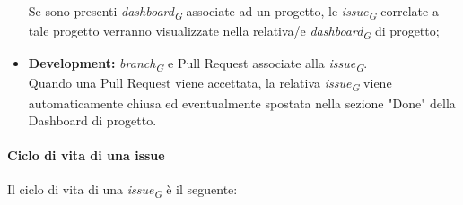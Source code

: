 \begin{itemize}
    Se sono presenti \textit{dashboard}\textsubscript{\textit{G}} associate ad un progetto, le \textit{issue}\textsubscript{\textit{G}} correlate a tale progetto verranno visualizzate nella relativa/e \textit{dashboard}\textsubscript{\textit{G}} di progetto;
    \item \textbf{Development:} \textit{branch}\textsubscript{\textit{G}} e Pull Request associate alla \textit{issue}\textsubscript{\textit{G}}. \\
    Quando una Pull Request viene accettata, la relativa \textit{issue}\textsubscript{\textit{G}} viene automaticamente chiusa ed eventualmente spostata nella sezione "Done" della Dashboard di progetto.
\end{itemize}

\paragraph*{Ciclo di vita di una issue}
Il ciclo di vita di una \textit{issue}\textsubscript{\textit{G}} è il seguente:
